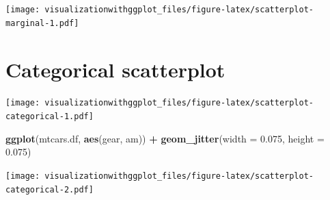 \documentclass[]{krantz}
\makeatletter
\newenvironment{Shaded}{\begin{snugshade}}{\end{snugshade}}
\newcommand{\DataTypeTok}[1]{\textcolor[rgb]{0.13,0.29,0.53}{#1}}
\newcommand{\FloatTok}[1]{\textcolor[rgb]{0.00,0.00,0.81}{#1}}
\newcommand{\KeywordTok}[1]{\textcolor[rgb]{0.13,0.29,0.53}{\textbf{#1}}}
\newcommand{\NormalTok}[1]{#1}
\newcommand{\OperatorTok}[1]{\textcolor[rgb]{0.81,0.36,0.00}{\textbf{#1}}}
\newcommand{\StringTok}[1]{\textcolor[rgb]{0.31,0.60,0.02}{#1}}
\newenvironment{kframe}{%
\medskip{}
\setlength{\fboxsep}{.8em}
 \def\at@end@of@kframe{}%
 \ifinner\ifhmode%
  \def\at@end@of@kframe{\end{minipage}}%
  \begin{minipage}{\columnwidth}%
 \fi\fi%
 \def\FrameCommand##1{\hskip\@totalleftmargin \hskip-\fboxsep
 \colorbox{shadecolor}{##1}\hskip-\fboxsep
     \hskip-\linewidth \hskip-\@totalleftmargin \hskip\columnwidth}%
 \MakeFramed {\advance\hsize-\width
   \@totalleftmargin\z@ \linewidth\hsize
   \@setminipage}}%
 {\par\unskip\endMakeFramed%
 \at@end@of@kframe}
\renewenvironment{Shaded}{\begin{kframe}}{\end{kframe}}
\makeatother
\begin{document}
\texttt{[image: visualizationwithggplot\_files/figure-latex/scatterplot-marginal-1.pdf]}

\hypertarget{categorical-scatterplot}{%
\section{Categorical scatterplot}\label{categorical-scatterplot}}

\begin{Shaded}
\end{Shaded}

\texttt{[image: visualizationwithggplot\_files/figure-latex/scatterplot-categorical-1.pdf]}

\begin{Shaded}
\begin{Highlighting}[]
 \KeywordTok{ggplot}\NormalTok{(mtcars.df, }\KeywordTok{aes}\NormalTok{(gear, am)) }\OperatorTok{+}\StringTok{ }
\StringTok{  }\KeywordTok{geom_jitter}\NormalTok{(}\DataTypeTok{width =} \FloatTok{0.075}\NormalTok{, }\DataTypeTok{height =} \FloatTok{0.075}\NormalTok{) }
\end{Highlighting}
\end{Shaded}

\texttt{[image: visualizationwithggplot\_files/figure-latex/scatterplot-categorical-2.pdf]}

\begin{Shaded}
\end{Shaded}
\end{document}
